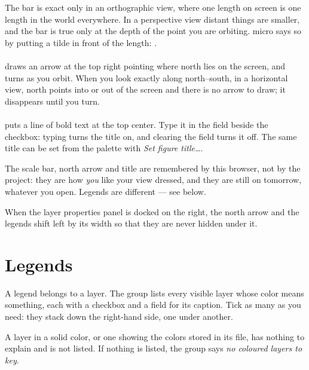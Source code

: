 The bar is exact only in an orthographic view, where one length on screen is one length in the world everywhere. In a perspective view distant things are smaller, and the bar is true only at the depth of the point you are orbiting. micro says so by putting a tilde in front of the length: .

\paragraph{} draws an arrow at the top right pointing where north lies on the screen, and turns as you orbit. When you look exactly along north–south, in a horizontal view, north points into or out of the screen and there is no arrow to draw; it disappears until you turn.

\paragraph{} puts a line of bold text at the top center. Type it in the field beside the checkbox: typing turns the title on, and clearing the field turns it off. The same title can be set from the palette with \emph{Set figure title…}.

\begin{note}
The scale bar, north arrow and title are remembered by this browser, not by the project: they are how \emph{you} like your view dressed, and they are still on tomorrow, whatever you open. Legends are different — see below.
\end{note}

When the layer properties panel is docked on the right, the north arrow and the legends shift left by its width so that they are never hidden under it.

\section{Legends}\label{sec:figures-legends}

A legend belongs to a layer. The  group lists every visible layer whose color means something, each with a checkbox and a field for its caption. Tick as many as you need: they stack down the right-hand side, one under another.

A layer in a solid color, or one showing the colors stored in its file, has nothing to explain and is not listed. If nothing is listed, the group says \emph{no coloured layers to key}.

